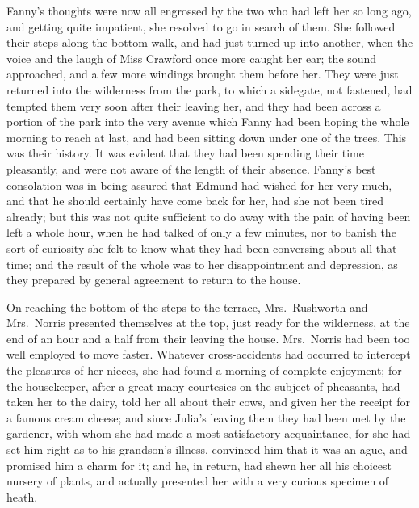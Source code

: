 Fanny's thoughts were now all engrossed by the two who
had left her so long ago, and getting quite impatient,
she resolved to go in search of them.  She followed
their steps along the bottom walk, and had just turned
up into another, when the voice and the laugh of Miss
Crawford once more caught her ear; the sound approached,
and a few more windings brought them before her.
They were just returned into the wilderness from the park,
to which a sidegate, not fastened, had tempted them very
soon after their leaving her, and they had been across
a portion of the park into the very avenue which Fanny
had been hoping the whole morning to reach at last,
and had been sitting down under one of the trees.
This was their history.  It was evident that they had been
spending their time pleasantly, and were not aware of the
length of their absence.  Fanny's best consolation was
in being assured that Edmund had wished for her very much,
and that he should certainly have come back for her,
had she not been tired already; but this was not quite
sufficient to do away with the pain of having been left
a whole hour, when he had talked of only a few minutes,
nor to banish the sort of curiosity she felt to know
what they had been conversing about all that time;
and the result of the whole was to her disappointment
and depression, as they prepared by general agreement to
return to the house.

On reaching the bottom of the steps to the terrace,
Mrs.\ Rushworth and Mrs.\ Norris presented themselves
at the top, just ready for the wilderness, at the end
of an hour and a half from their leaving the house.
Mrs.\ Norris had been too well employed to move faster.
Whatever cross-accidents had occurred to intercept the pleasures
of her nieces, she had found a morning of complete enjoyment;
for the housekeeper, after a great many courtesies on
the subject of pheasants, had taken her to the dairy,
told her all about their cows, and given her the receipt
for a famous cream cheese; and since Julia's leaving them
they had been met by the gardener, with whom she had made
a most satisfactory acquaintance, for she had set him
right as to his grandson's illness, convinced him that it
was an ague, and promised him a charm for it; and he,
in return, had shewn her all his choicest nursery of plants,
and actually presented her with a very curious specimen
of heath.

